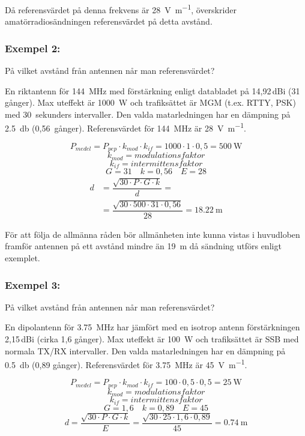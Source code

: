Då referensvärdet på denna frekvens är \qty{28}{\volt\per\metre}, överskrider
amatörradiosändningen referensvärdet på detta avstånd.

\subsubsection{Exempel 2:}

På vilket avstånd från antennen når man referensvärdet?

En riktantenn för \qty{144}{\mega\hertz} med förstärkning enligt databladet på
14,92\,dBi (31 gånger).
Max uteffekt är \qty{1000}{\watt} och trafiksättet är MGM (t.ex. RTTY, PSK) med
30~sekunders intervaller.
Den valda matarledningen har en dämpning på \qty{2,5}{\decibel} (0,56~gånger).
Referensvärdet för \qty{144}{\mega\hertz} är \qty{28}{\volt\per\metre}.

\[P_{medel} = P_{pep} \cdot k_{mod} \cdot k_{if}
= 1000 \cdot 1 \cdot 0,5 = \qty{500}{\watt}\]
\[k_{mod} = \textit{modulationsfaktor}\]
\[k_{if} = \textit{intermittensfaktor}\]
\[G = 31 \quad k = 0,56 \quad E = 28\]
\begin{align*}
  d &= \dfrac{\sqrt{30 \cdot P \cdot G \cdot k}}{d} =\\
&= \dfrac{\sqrt{30 \cdot 500 \cdot 31 \cdot 0,56}}{28}
  = \qty{18,22}{\metre}
  \end{align*}

För att följa de allmänna råden bör allmänheten inte kunna vistas i huvudloben
framför antennen på ett avstånd mindre än \qty{19}{\metre} då sändning utförs
enligt exemplet.

\subsubsection{Exempel 3:}

På vilket avstånd från antennen når man referensvärdet?

En dipolantenn för \qty{3,75}{\mega\hertz} har jämfört med en isotrop antenn
förstärkningen 2,15\,dBi (cirka 1,6 gånger).
Max uteffekt är \qty{100}{\watt} och trafiksättet är SSB med normala TX/RX
intervaller.
Den valda matarledningen har en dämpning på \qty{0,5}{\decibel} (0,89 gånger).
Referensvärdet för \qty{3,75}{\mega\hertz} är \qty{45}{\volt\per\metre}.

\[P_{medel} = P_{pep} \cdot k_{mod} \cdot k_{if}
= 100 \cdot 0,5 \cdot 0,5 = \qty{25}{\watt}\]
\[k_{mod} = modulationsfaktor\]
\[k_{if} = intermittensfaktor\]
\[G = 1,6 \quad k = 0,89 \quad E = 45\]
\[d = \dfrac{\sqrt{30 \cdot P \cdot G \cdot k}}{E} = \dfrac{\sqrt{30 \cdot 25 \cdot 1,6 \cdot 0,89}}{45}
= \qty{0,74}{\metre}\]

